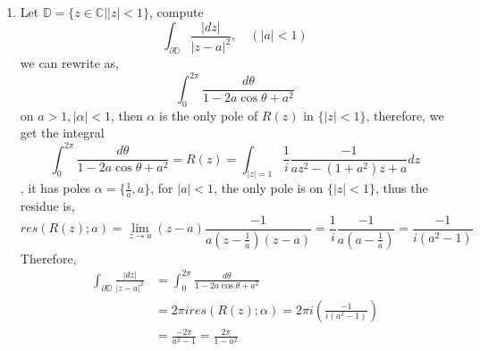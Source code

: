 \documentclass[a4paper,12pt]{article}
\newcommand{\C}{\mathbb{C}}
\newcommand{\D}{\mathbb{D}}
\begin{document}
\begin{enumerate}
\item Let $\D = \{ z\in \C | |z|<1 \}$, compute
\begin{equation*}
\int_{\partial \D} \frac{|dz|}{|z-a|^2}, \quad (|a|<1)
\end{equation*}
we can rewrite as,
\begin{equation*}
\int_{0}^{2\pi} \frac{d\theta}{1-2a\cos \theta + a^2}
\end{equation*}
on $a>1, |\alpha|<1$, then $\alpha$ is the only pole of $R(z)$ in $\{ |z|<1 \}$, therefore, we get the integral
\begin{equation*}
\int_{0}^{2\pi} \frac{d\theta}{1-2a\cos \theta + a^2} = R(z) = \int_{|z|=1} \frac{1}{i}\frac{-1}{az^2 - (1+a^2)z+a} dz
\end{equation*}, it has poles $\alpha=\{\frac{1}{a}, a\}$, for $|a|<1$, the only pole is on $\{ |z| < 1\}$, thus the residue is,
\begin{equation*}
res(R(z);a) = \lim_{z\to a} (z-a)\frac{-1}{a(z-\frac{1}{a})(z-a)} = \frac{1}{i} \frac{-1}{a(a-\frac{1}{a})} = \frac{-1}{i(a^2-1)}
\end{equation*}
Therefore,
\begin{equation*}
\begin{aligned}
\int_{\partial \D} \frac{|dz|}{|z-a|^2} &= \int_{0}^{2\pi} \frac{d\theta}{1-2a\cos \theta + a^2}\\
&= 2\pi i res(R(z);\alpha) = 2\pi i \left( \frac{-1}{i(a^2-1)} \right)\\
&= \frac{-2\pi}{a^2-1} = \frac{2\pi}{1-a^2}
\end{aligned}
\end{equation*}
\end{enumerate}
\end{document}
